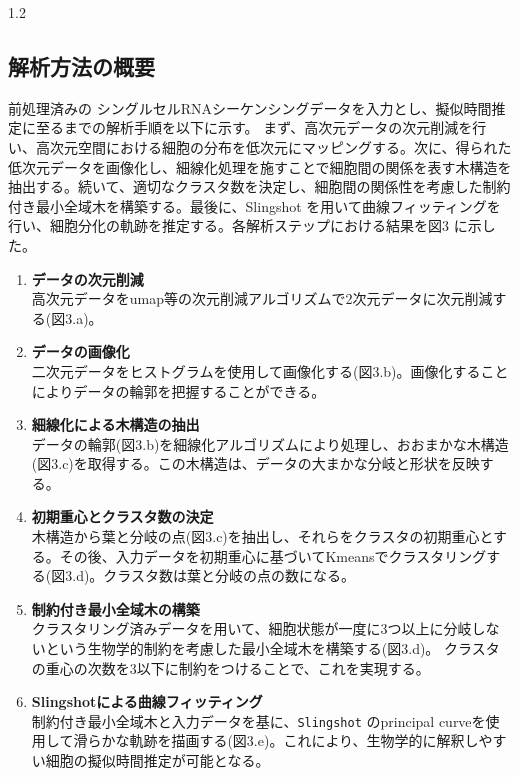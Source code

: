 \documentclass[dvipdfmx,11pt]{kuisthesis}
\begin{document}
\begin{spacing}{1.2}
\subsection{解析方法の概要}\label{subsec-instruction-1}
\bigskip
前処理済みの シングルセルRNAシーケンシングデータを入力とし、擬似時間推定に至るまでの解析手順を以下に示す。
まず、高次元データの次元削減を行い、高次元空間における細胞の分布を低次元にマッピングする。次に、得られた低次元データを画像化し、細線化処理を施すことで細胞間の関係を表す木構造を抽出する。続いて、適切なクラスタ数を決定し、細胞間の関係性を考慮した制約付き最小全域木を構築する。最後に、Slingshot を用いて曲線フィッティングを行い、細胞分化の軌跡を推定する。各解析ステップにおける結果を図3 に示した。
\begin{enumerate}
  \item \textbf{データの次元削減}  \\
  高次元データをumap等の次元削減アルゴリズムで2次元データに次元削減する(図3.a)。
  \item \textbf{データの画像化}  \\
  二次元データをヒストグラムを使用して画像化する(図3.b)。画像化することによりデータの輪郭を把握することができる。
  \item \textbf{細線化による木構造の抽出}  \\
  データの輪郭(図3.b)を細線化アルゴリズムにより処理し、おおまかな木構造(図3.c)を取得する。この木構造は、データの大まかな分岐と形状を反映する。
  \item \textbf{初期重心とクラスタ数の決定}   \\
  木構造から葉と分岐の点(図3.c)を抽出し、それらをクラスタの初期重心とする。その後、入力データを初期重心に基づいてKmeansでクラスタリングする(図3.d)。クラスタ数は葉と分岐の点の数になる。
  \item \textbf{制約付き最小全域木の構築}   \\
  クラスタリング済みデータを用いて、細胞状態が一度に3つ以上に分岐しないという生物学的制約を考慮した最小全域木を構築する(図3.d)。
  クラスタの重心の次数を3以下に制約をつけることで、これを実現する。
  \item \textbf{Slingshotによる曲線フィッティング}   \\
  制約付き最小全域木と入力データを基に、\texttt{Slingshot} のprincipal curveを使用して滑らかな軌跡を描画する(図3.e)。これにより、生物学的に解釈しやすい細胞の擬似時間推定が可能となる。
\end{enumerate}


\end{spacing}
\end{document}
